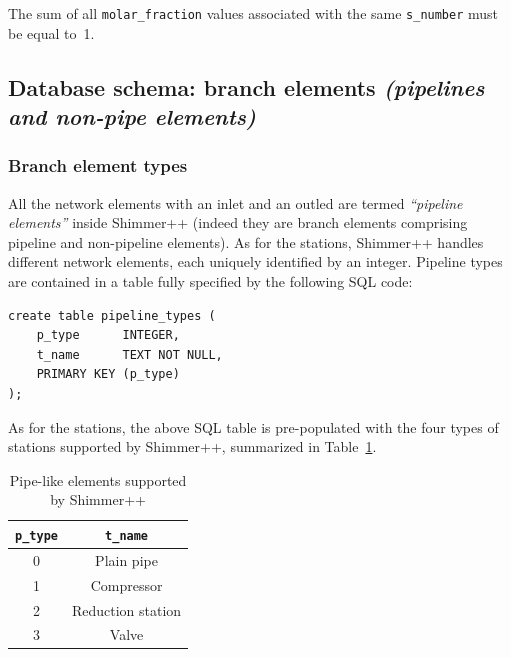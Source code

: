 The sum of all \texttt{molar\_fraction} values associated with the same \texttt{s\_number} must be equal to~1.

\clearpage
\subsection{Database schema: branch elements \textit{(pipelines and non-pipe elements)}}
\subsubsection{Branch element types}
All the network elements with an inlet and an outled are termed \textit{``pipeline elements''}
inside Shimmer++ (indeed they are branch elements comprising pipeline and non-pipeline elements). As for the stations, Shimmer++ handles different network elements, 
each uniquely identified by an integer. Pipeline types are contained in a table
fully specified by the following SQL code:
\begin{verbatim}
create table pipeline_types (
    p_type      INTEGER,
    t_name      TEXT NOT NULL,
    PRIMARY KEY (p_type)
);
\end{verbatim}

As for the stations, the above SQL table is pre-populated with the four types
of stations supported by Shimmer++, summarized in Table~\ref{tbl:pipetypes}.
\begin{table}[ht]
    \centering
    \begin{tabular}{|c|c|}
        \hline
        \texttt{p\_type} & \texttt{t\_name} \\
        \hline
        0 & Plain pipe \\
        1 & Compressor \\
        2 & Reduction station \\
        3 & Valve \\ \hline
    \end{tabular}
    \caption{Pipe-like elements supported by Shimmer++}
    \label{tbl:pipetypes}
\end{table}

